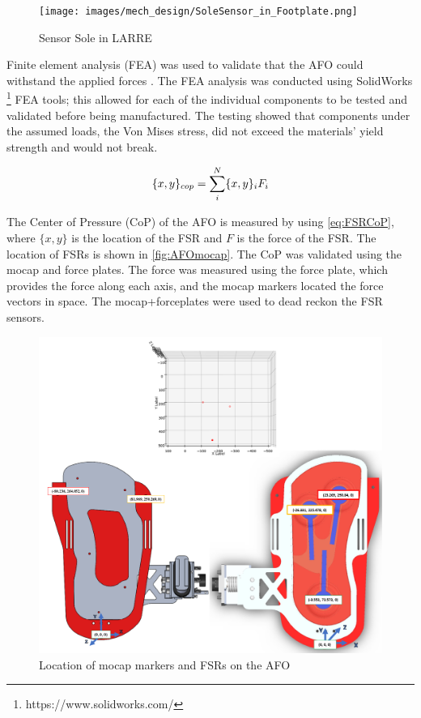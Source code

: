 \begin{figure}[h!]
    \centering
    \texttt{[image: images/mech\_design/SoleSensor\_in\_Footplate.png]}
    \caption[Sensing Sole]{Sensor Sole in LARRE}
    \label{fig:SensingSole}
\end{figure}



Finite element analysis (FEA) was used to validate that the AFO could withstand the applied forces \cite{akin2010finite}. The FEA analysis was conducted using SolidWorks \footnote{https://www.solidworks.com/} FEA tools; this allowed for each of the individual components to be tested and validated before being manufactured. The testing showed that components under the assumed loads, the Von Mises \cite{shigley} stress, did not exceed the materials' yield strength and would not break.

\begin{equation}
\large
    \{x,y\}_{cop} = \sum_{i}^{N} \{x,y\}_i F_i
    \label{eq:FSRCoP}
\end{equation}

The Center of Pressure (CoP) of the AFO is measured by using \autoref{eq:FSRCoP}, where $\{x,y\}$ is the location of the FSR and $F$ is the force of the FSR. The location of FSRs is shown in \autoref{fig:AFOmocap}. The CoP was validated using the mocap and force plates. The force was measured using the force plate, which provides the force along each axis, and the mocap markers located the force vectors in space. The mocap+forceplates were used to dead reckon the FSR sensors. 




 \begin{figure}[h]
    \ContinuedFloat
           \captionsetup{justification=centering}
           \centerline{ \includegraphics[scale=0.22]{images/mech_design/Mocap_Layout_2.png}}
            \caption[AFO Mocap Markers]{Location of mocap markers and FSRs on the AFO \cite{Michaels2020}}
            \label{fig:AFOmocap}
    \end{figure}


